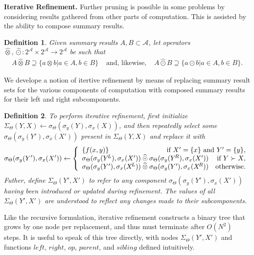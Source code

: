 \documentclass{article}
\newtheorem{definition} {Definition}
\newcommand{\GNP}[1][\psi]{{#1}_{\Theta}}
\newcommand{\otimeshat}{\mathbin{\widehat{\otimes}}}
\newcommand{\odothat}{\mathbin{\widehat{\odot}}}
\begin{document}
{\bf Iterative Refinement.}  Further pruning is possible in some
problems by considering results gathered from other parts of
computation.  This is assisted by the ability to compose summary
results.
\begin{definition}
  Given summary results $A, B \subset \mathcal{A}$, let operators
  $\otimeshat, \odothat \colon 2^{\mathcal{A}} \times 2^{\mathcal{A}}
  \to 2^{\mathcal{A}}$ be such that
  \[ \begin{array}{rcl}
    A \otimeshat B \supseteq \{a \otimes b | a \in A, b \in B\} & \mbox{ and, likewise, } & A \odothat B \supseteq \{a \odot b | a \in A, b \in B\}.
  \end{array} \]
\end{definition}
\noindent We develope a notion of itertive refinement by means of
replacing summary result sets for the various components of
computation with composed summary results for their left and right
subcomponents.
\begin{definition}
  To perform {\em iterative refinement}, first initialize
  $\GNP[\Sigma](Y,X) \leftarrow
  \GNP[\sigma](\sigma_y(Y),\sigma_x(X))$, and then repeatedly select
  some $\GNP[\sigma](\sigma_y(Y'),\sigma_x(X'))$ present in
  $\GNP[\Sigma](Y,X)$ and replace it with
  \[
  \GNP[\sigma](\sigma_y(Y'),\sigma_x(X')) \leftarrow \left\{ \begin{array}{lrr}
    \{f(x,y)\} & \multicolumn{2}{r}{\mbox{if } X' = \{x\} \mbox{ and } Y' = \{y\},} \\
    \multicolumn{2}{l}{\GNP[\sigma](\sigma_y(Y^{\!L}),\sigma_x(X')) \odothat \GNP[\sigma](\sigma_y(Y^{\!R}),\sigma_x(X'))} & \mbox{if } Y \succ X, \\
    \multicolumn{2}{l}{\GNP[\sigma](\sigma_y(Y'),\sigma_x(X^{\!L})) \otimeshat \GNP[\sigma](\sigma_y(Y'),\sigma_x(X^{\!R}))} & \mbox{otherwise}.
  \end{array} \right.
  \]
  Futher, define $\GNP[\Sigma](Y',X')$ to refer to any component
  $\GNP[\sigma](\sigma_y(Y'),\sigma_x(X'))$ having been introduced or
  updated during refinement.  The values of all $\GNP[\Sigma](Y',X')$
  are understood to reflect any changes made to their subcomponents.
\end{definition}
\noindent Like the recursive formulation, iterative refinement
constructs a binary tree that grows by one node per replacement, and
thus must terminate after $O(N^2)$ steps.  It is useful to speak of
this tree directly, with nodes $\GNP[\Sigma](Y',X')$ and functions
$left$, $right$, $op$, $parent$, and $sibling$ defined intuitively.
\end{document}
